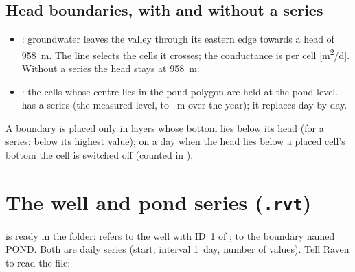 \subsection{Head boundaries, with and without a series}
\begin{itemize}
\item {}: groundwater leaves the valley
      through its eastern edge towards a head of 958~m. The line selects the cells it crosses; the conductance is per cell
      [m\textsuperscript{2}/d]. Without a  series the head stays at 958~m.
\item {}: the cells whose centre lies in the pond polygon
      are held at the pond level.  has a  series (the measured level,  to
      ~m over the year); it replaces  day by day.
\end{itemize}
A boundary is placed only in layers whose bottom lies below its head (for a series: below its highest value); on a day
when the head lies below a placed cell's bottom the cell is switched off (counted in ).

\section{The well and pond series (\texttt{.rvt})}
 is ready in the folder:
 refers to the well with ID~1 of ;  to the boundary named
POND. Both are daily series (start, interval 1~day, number of values). Tell Raven to read the file:

